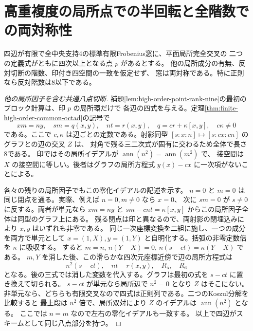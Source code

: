 \section{高重複度の局所点での半回転と全階数での両対称性}
\label{sec:finite-high-order-half-turn}
\begin{theorem}\label{thm:finite-high-order-half-turn}
四辺が有限で全中央支持4の標準有限Frobenius窓に、平面局所完全交叉の
二つの定義式がともに四次以上となる点 $p$ があるとする。
他の局所成分の有無、反対切断の階数、印付き四空間の一致を仮定せず、
窓は両対称である。特に正則なら反対階数は8以下である。
\end{theorem}
\begin{proof}[他の局所因子を含む共通八点切断]
補題\ref{lem:high-order-point-rank-nine}の最初のブロック計算は、印 $p$ の局所環だけで
各辺の四式を与える。定理\ref{thm:finite-high-order-common-octad}の記号で
\[
      xm=ny,\quad sm=q(x,y),\quad nt=r(x,y),\quad
      q=c r+\kappa[x,y],\quad c\kappa\ne0
\]
である。ここで $c,\kappa$ は辺ごとの定数である。射影同型
$[s:x:n]\mapsto[s:cx:cn]$ のグラフとの辺の交叉 $Z$ は、
対角で残る三二次式が固有に交わるため全体で長さ8である。
印ではその局所イデアルが $\operatorname{ann}(n^2)=\operatorname{ann}(m^2)$ で、
接空間は $X$ の接空間に等しい。後者はグラフの局所方程式 $y(x)-cx$ に一次項がないことによる。

各々の残りの局所因子でもこの零化イデアルの記述を示す。
$n=0$ と $m=0$ は同じ閉点を通る。実際、例えば $n=0,m\ne0$ なら $x=0$、
次に $sm=0$ が $s\ne0$ に反する。両者が単元なら $xm=ny$ と
$sm-cnt=\kappa[x,y]$ からこの局所因子全体は同型のグラフ上にある。
残る閉点は印と異なるので、両射影の閉埋込みにより $x,y$ はいずれも非零である。
同じ一次座標変換を二組に施し、一つの成分を両方で単元として
$x=(1,X),y=(1,Y)$ と自明化する。括弧の非零定数倍を $\kappa$ に吸収する。
すると $m=n$, $n(Y-X)=0$, $n(s-c t)=\kappa(Y-X)$ である。
$m,Y$ を消した後、この滑らかな四次元座標近傍で辺の局所方程式は
\[
     n^2(s-c t),\quad nt-r(x,y),\quad R_5,\quad R_6
\]
となる。後の三式では消した変数を代入する。グラフは最初の式を $s-ct$ に置き換えて切られる。
$s-ct$ が単元なら局所辺で $n^2=0$ となり $Z$ はそこにない。
非単元なら、どちらも有限交叉なので四式は正則列である。二つのKoszul分解を比較すると
最上段は $n^2$ 倍で、局所双対により $Z$ のイデアルは $\operatorname{ann}(n^2)$ となる。
ここでは $n=m$ なので左右の零化イデアルも一致する。
以上で四辺がスキームとして同じ八点部分を持つ。
\end{proof}

